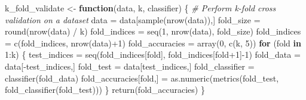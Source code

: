 \documentclass[
]{article}
\newenvironment{Shaded}{\begin{snugshade}}{\end{snugshade}}
\newcommand{\CommentTok}[1]{\textcolor[rgb]{0.56,0.35,0.01}{\textit{#1}}}
\newcommand{\ControlFlowTok}[1]{\textcolor[rgb]{0.13,0.29,0.53}{\textbf{#1}}}
\newcommand{\DecValTok}[1]{\textcolor[rgb]{0.00,0.00,0.81}{#1}}
\newcommand{\FunctionTok}[1]{\textcolor[rgb]{0.00,0.00,0.00}{#1}}
\newcommand{\NormalTok}[1]{#1}
\newcommand{\OtherTok}[1]{\textcolor[rgb]{0.56,0.35,0.01}{#1}}
\newcommand{\SpecialCharTok}[1]{\textcolor[rgb]{0.00,0.00,0.00}{#1}}
\begin{document}
\begin{Shaded}
\begin{Highlighting}[]
\NormalTok{k\_fold\_validate }\OtherTok{\textless{}{-}} \ControlFlowTok{function}\NormalTok{(data, k, classifier) \{}
    \CommentTok{\#\textquotesingle{} Perform k{-}fold cross validation on a dataset}
\NormalTok{    data }\OtherTok{=}\NormalTok{ data[}\FunctionTok{sample}\NormalTok{(}\FunctionTok{nrow}\NormalTok{(data)),]}
\NormalTok{    fold\_size }\OtherTok{=} \FunctionTok{round}\NormalTok{(}\FunctionTok{nrow}\NormalTok{(data) }\SpecialCharTok{/}\NormalTok{ k)}
\NormalTok{    fold\_indices }\OtherTok{=} \FunctionTok{seq}\NormalTok{(}\DecValTok{1}\NormalTok{, }\FunctionTok{nrow}\NormalTok{(data), fold\_size)}
\NormalTok{    fold\_indices }\OtherTok{=} \FunctionTok{c}\NormalTok{(fold\_indices, }\FunctionTok{nrow}\NormalTok{(data)}\SpecialCharTok{+}\DecValTok{1}\NormalTok{)}
\NormalTok{    fold\_accuracies }\OtherTok{=} \FunctionTok{array}\NormalTok{(}\DecValTok{0}\NormalTok{, }\FunctionTok{c}\NormalTok{(k, }\DecValTok{5}\NormalTok{))}
    \ControlFlowTok{for}\NormalTok{ (fold }\ControlFlowTok{in} \DecValTok{1}\SpecialCharTok{:}\NormalTok{k) \{}
\NormalTok{        test\_indices }\OtherTok{=} \FunctionTok{seq}\NormalTok{(fold\_indices[fold], fold\_indices[fold}\SpecialCharTok{+}\DecValTok{1}\NormalTok{]}\SpecialCharTok{{-}}\DecValTok{1}\NormalTok{)}
\NormalTok{        fold\_data }\OtherTok{=}\NormalTok{ data[}\SpecialCharTok{{-}}\NormalTok{test\_indices,]}
\NormalTok{        fold\_test }\OtherTok{=}\NormalTok{ data[test\_indices,]}
\NormalTok{        fold\_classifier }\OtherTok{=} \FunctionTok{classifier}\NormalTok{(fold\_data)}
\NormalTok{        fold\_accuracies[fold,] }\OtherTok{=} \FunctionTok{as.numeric}\NormalTok{(}\FunctionTok{metrics}\NormalTok{(fold\_test, }\FunctionTok{fold\_classifier}\NormalTok{(fold\_test)))}
\NormalTok{    \}}
    \FunctionTok{return}\NormalTok{(fold\_accuracies)}
\NormalTok{\}}
\end{Highlighting}
\end{Shaded}

\begin{Shaded}
\end{Shaded}
\end{document}
